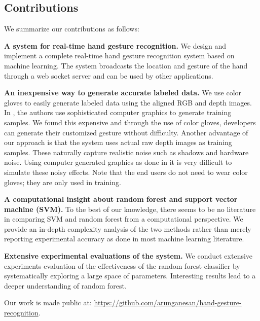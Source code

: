 \cutsection
\subsection{Contributions}
\cutsection
We summarize our contributions as follows:
\cutequation

\textbf{A system for real-time hand gesture recognition.} We design and implement a complete real-time hand gesture recognition system based on machine learning. The system broadcasts the location and gesture of the hand through a web socket server and can be used by other applications.
\cutequation

\textbf{An inexpensive way to generate accurate labeled data.} We use color gloves to easily generate labeled data using the aligned RGB and depth images. In \cite{shotton2011}, the authors use sophisticated computer graphics to generate training samples. We found this expensive and through the use of color gloves, developers can generate their customized gesture without difficulty. Another advantage of our approach is that the system uses actual raw depth images as training samples. These naturally capture realistic noise such as shadows and hardware noise. Using computer generated graphics as done in \cite{shotton2011} it is very difficult to simulate these noisy effects. Note that the end users do not need to wear color gloves; they are only used in training.
\cutequation 

\textbf{A computational insight about random forest and support vector machine (SVM).} To the best of our knowledge, there seems to be no literature in comparing SVM and random forest from a computational perspective. We provide an in-depth complexity analysis of the two methods rather than merely reporting experimental accuracy as done in most machine learning literature. 
\cutequation 

\textbf{Extensive experimental evaluations of the system.} We conduct extensive experiments evaluation of the effectiveness of the random forest classifier by systematically exploring a large space of parameters. Interesting results lead to a deeper understanding of random forest. 

Our work is made public at: \url{https://github.com/arunganesan/hand-gesture-recognition}.

\cutsection
